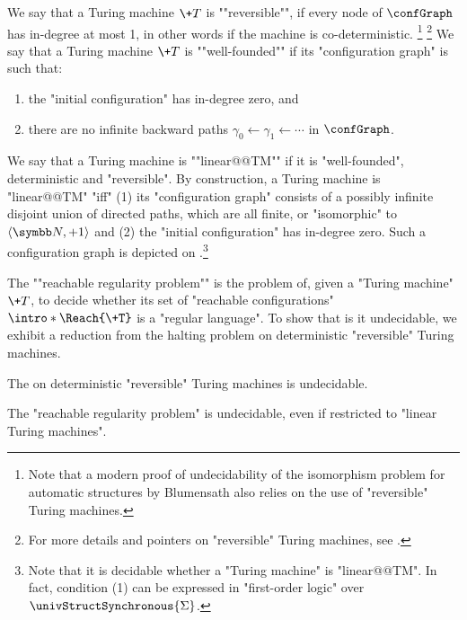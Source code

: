 \AP We say that a Turing machine $\+T$ is ""reversible"", if every node of $\confGraph$ has in-degree at most 1, in other words if the machine is co-deterministic.%
\footnote{
    Note that a modern proof of undecidability of the isomorphism problem for automatic structures 
    by Blumensath \cite[\S VIII. Theorem 4.3, p. 396 \& second claim, p. 398]{Blumensath2024MSOModelTheory} 
    also relies on the use of "reversible" Turing machines.
}%
\footnote{
    For more details and pointers on "reversible" Turing machines,
    see \cite[Chapter 5]{Morita2017Reversible}.
}
We say that a Turing machine $\+T$ is ""well-founded"" if its "configuration graph" is such that:
\begin{enumerate}
    \item the "initial configuration" has in-degree zero, and
    \item there are no infinite backward paths $\gamma_0 \leftarrow \gamma_1 \leftarrow \cdots$ in $\confGraph$. 
\end{enumerate}

We say that a Turing machine is ""linear@@TM"" if it is "well-founded", deterministic and "reversible".
By construction, a Turing machine is "linear@@TM" "iff" (1) its "configuration graph" consists of a possibly infinite disjoint union of directed paths, which are all finite, or "isomorphic" to $\tup{\N, +1}$ and (2) the "initial configuration" has in-degree zero.
Such a configuration graph is depicted on
.\footnote{Note
that it is decidable whether a "Turing machine" is "linear@@TM". In fact, condition (1) can be expressed in "first-order logic" over $\univStructSynchronous{\Sigma}$.}

\AP The ""reachable regularity problem"" is the problem of, given a "Turing machine" $\+T$, to decide whether its set of "reachable configurations" \AP$\intro*\Reach{\+T}$ is a "regular language". To show that is it undecidable, we exhibit a reduction from the halting problem on deterministic "reversible" Turing machines.

\begin{proposition}
    \AP\label{prop:halting-problem-detrevTM}
    The  on deterministic "reversible" Turing machines is undecidable.
\end{proposition}

\begin{lemma}
    \AP\label{lem:reachable-regularity}
    The "reachable regularity problem" is undecidable, even if restricted
    to "linear Turing machines".
\end{lemma}

